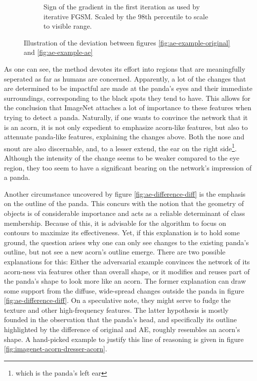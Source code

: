 \documentclass[11pt, a4paper]{article}
\begin{document}
\begin{figure}[h!tb]
\begin{subfigure}[t]{0.45\textwidth}
        \caption{Sign of the gradient in the first iteration as used by iterative FGSM. Scaled by the 98th percentile to scale to visible range.}
        \label{fig:ae-difference-grad}
    \end{subfigure}
    \caption[Difference between original and adversarial example]{Illustration of the deviation between figures \ref{fig:ae-example-original} and \ref{fig:ae-example-ae}}
    \label{fig:ae-difference}
\end{figure}

As one can see, the method devotes its effort into regions that are meaningfully seperated as far as humans are concerned. Apparently, a lot of the changes that are determined to be impactful are made at the panda's eyes and their immediate surroundings, corresponding to the black spots they tend to have. This allows for the conclusion that ImageNet attaches a lot of importance to these features when trying to detect a panda. Naturally, if one wants to convince the network that it is an acorn, it is not only expedient to emphasize acorn-like features, but also to attenuate panda-like features, explaining the changes above. Both the nose and snout are also discernable, and, to a lesser extend, the ear on the right side\footnote{which is the panda's left ear}. Although the intensity of the change seems to be weaker compared to the eye region, they too seem to have a significant bearing on the network's impression of a panda.

Another circumstance uncovered by figure \ref{fig:ae-difference-diff} is the emphasis on the outline of the panda. This concurs with the notion that the geometry of objects is of considerable importance and acts as a reliable determinant of class membership. Because of this, it is advisable for the algorithm to focus on contours to maximize its effectiveness. Yet, if this explanation is to hold some ground, the question arises why one can only see changes to the existing panda's outline, but not see a new acorn's outline emerge. There are two possible explanations for this: Either the adversarial example convinces the network of its acorn-ness via features other than overall shape, or it modifies and reuses part of the panda's shape to look more like an acorn. The former explanation can draw some support from the diffuse, wide-spread changes outside the panda in figure \ref{fig:ae-difference-diff}. On a speculative note, they might serve to fudge the texture and other high-frequency features. The latter hypothesis is mostly founded in the observation that the panda's head, and specifically its outline highlighted by the difference of original and AE, roughly resembles an acorn's shape. A hand-picked example to justify this line of reasoning is given in figure \ref{fig:imagenet-acorn-dresser-acorn}.
\end{document}
